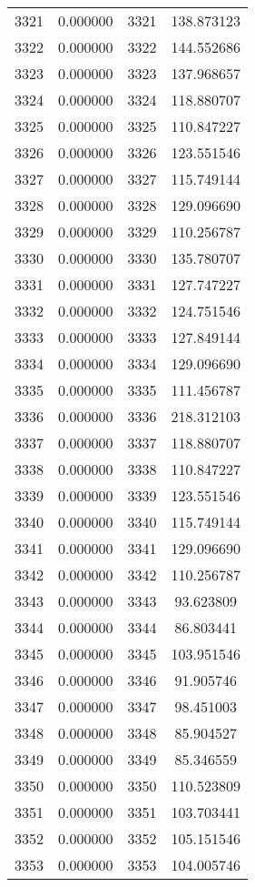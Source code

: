 \documentclass[12pt]{article}
\begin{document}
\begin{longtable}{@{}cccc@{}}
3321 & 0.000000 & 3321 & 138.873123 \\
3322 & 0.000000 & 3322 & 144.552686 \\
3323 & 0.000000 & 3323 & 137.968657 \\
3324 & 0.000000 & 3324 & 118.880707 \\
3325 & 0.000000 & 3325 & 110.847227 \\
3326 & 0.000000 & 3326 & 123.551546 \\
3327 & 0.000000 & 3327 & 115.749144 \\
3328 & 0.000000 & 3328 & 129.096690 \\
3329 & 0.000000 & 3329 & 110.256787 \\
3330 & 0.000000 & 3330 & 135.780707 \\
3331 & 0.000000 & 3331 & 127.747227 \\
3332 & 0.000000 & 3332 & 124.751546 \\
3333 & 0.000000 & 3333 & 127.849144 \\
3334 & 0.000000 & 3334 & 129.096690 \\
3335 & 0.000000 & 3335 & 111.456787 \\
3336 & 0.000000 & 3336 & 218.312103 \\
3337 & 0.000000 & 3337 & 118.880707 \\
3338 & 0.000000 & 3338 & 110.847227 \\
3339 & 0.000000 & 3339 & 123.551546 \\
3340 & 0.000000 & 3340 & 115.749144 \\
3341 & 0.000000 & 3341 & 129.096690 \\
3342 & 0.000000 & 3342 & 110.256787 \\
3343 & 0.000000 & 3343 & 93.623809 \\
3344 & 0.000000 & 3344 & 86.803441 \\
3345 & 0.000000 & 3345 & 103.951546 \\
3346 & 0.000000 & 3346 & 91.905746 \\
3347 & 0.000000 & 3347 & 98.451003 \\
3348 & 0.000000 & 3348 & 85.904527 \\
3349 & 0.000000 & 3349 & 85.346559 \\
3350 & 0.000000 & 3350 & 110.523809 \\
3351 & 0.000000 & 3351 & 103.703441 \\
3352 & 0.000000 & 3352 & 105.151546 \\
3353 & 0.000000 & 3353 & 104.005746 \\

\end{longtable}
\end{document}
